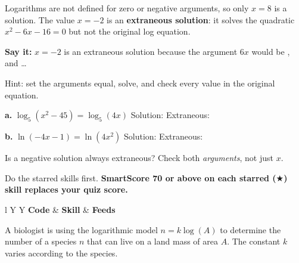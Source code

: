 \vspace{4pt}
Logarithms are not defined for zero or negative arguments, so only $x=8$ is a solution. The value $x=-2$ is an \textbf{extraneous solution}: it solves the quadratic $x^2-6x-16=0$ but not the original log equation.

\textbf{Say it:} $x=-2$ is an extraneous solution because the argument $6x$ would be \blank[1.5cm], and \dots
\lines[2]

Hint: set the arguments equal, solve, and check every value in the original equation.

\begin{minipage}[t]{0.48\textwidth}
\textbf{a.} $\log_5(x^2-45)=\log_5(4x)$
\lines[5]
Solution: \blank[2.2cm] \quad Extraneous: \blank[1.8cm]
\end{minipage}\hfill
\begin{minipage}[t]{0.48\textwidth}
\textbf{b.} $\ln(-4x-1)=\ln(4x^2)$
\lines[5]
Solution: \blank[2.2cm] \quad Extraneous: \blank[1.8cm]
\end{minipage}

Is a negative solution always extraneous? Check both \emph{arguments}, not just $x$.
\lines[2]

\newpage

Do the starred skills first. \textbf{SmartScore 70 or above on each starred ($\bigstar$) skill replaces your quiz score.}

\vspace{2pt}
\begin{tabularx}{\textwidth}{l Y Y}
\toprule
\textbf{Code} & \textbf{Skill} & \textbf{Feeds} \\
\midrule
{}
\bottomrule
\end{tabularx}

A biologist is using the logarithmic model $n=k\log(A)$ to determine the number of a species $n$ that can live on a land mass of area $A$. The constant $k$ varies according to the species.

